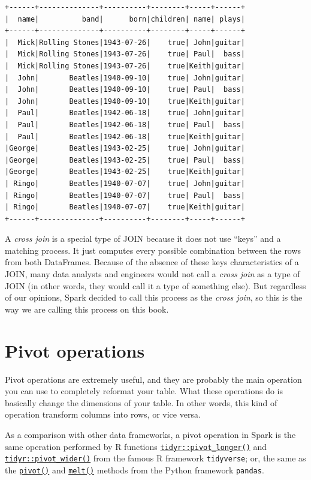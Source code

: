 \documentclass[
  11pt,
  letterpaper,
  DIV=11,
  numbers=noendperiod]{scrreprt}
\begin{document}
\begin{verbatim}
+------+--------------+----------+--------+-----+------+
|  name|          band|      born|children| name| plays|
+------+--------------+----------+--------+-----+------+
|  Mick|Rolling Stones|1943-07-26|    true| John|guitar|
|  Mick|Rolling Stones|1943-07-26|    true| Paul|  bass|
|  Mick|Rolling Stones|1943-07-26|    true|Keith|guitar|
|  John|       Beatles|1940-09-10|    true| John|guitar|
|  John|       Beatles|1940-09-10|    true| Paul|  bass|
|  John|       Beatles|1940-09-10|    true|Keith|guitar|
|  Paul|       Beatles|1942-06-18|    true| John|guitar|
|  Paul|       Beatles|1942-06-18|    true| Paul|  bass|
|  Paul|       Beatles|1942-06-18|    true|Keith|guitar|
|George|       Beatles|1943-02-25|    true| John|guitar|
|George|       Beatles|1943-02-25|    true| Paul|  bass|
|George|       Beatles|1943-02-25|    true|Keith|guitar|
| Ringo|       Beatles|1940-07-07|    true| John|guitar|
| Ringo|       Beatles|1940-07-07|    true| Paul|  bass|
| Ringo|       Beatles|1940-07-07|    true|Keith|guitar|
+------+--------------+----------+--------+-----+------+
\end{verbatim}

A \emph{cross join} is a special type of JOIN because it does not use
``keys'' and a matching process. It just computes every possible
combination between the rows from both DataFrames. Because of the
absence of these keys characteristics of a JOIN, many data analysts and
engineers would not call a \emph{cross join} as a type of JOIN (in other
words, they would call it a type of something else). But regardless of
our opinions, Spark decided to call this process as the \emph{cross
join}, so this is the way we are calling this process on this book.

\hypertarget{pivot-operations}{%
\section{Pivot operations}\label{pivot-operations}}

Pivot operations are extremely useful, and they are probably the main
operation you can use to completely reformat your table. What these
operations do is basically change the dimensions of your table. In other
words, this kind of operation transform columns into rows, or vice
versa.

As a comparison with other data frameworks, a pivot operation in Spark
is the same operation performed by R functions
\href{https://tidyr.tidyverse.org/reference/pivot_longer.html}{\texttt{tidyr::pivot\_longer()}}
and
\href{https://tidyr.tidyverse.org/reference/pivot_wider.html}{\texttt{tidyr::pivot\_wider()}}
from the famous R framework \texttt{tidyverse}; or, the same as the
\href{https://pandas.pydata.org/docs/reference/api/pandas.DataFrame.pivot.html}{\texttt{pivot()}}
and
\href{https://pandas.pydata.org/docs/reference/api/pandas.melt.html}{\texttt{melt()}}
methods from the Python framework \texttt{pandas}.
\end{document}
